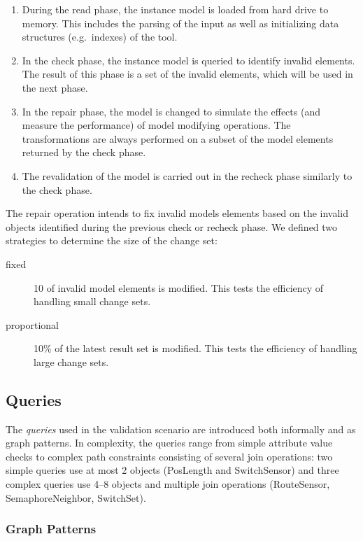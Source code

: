 \documentclass[submission,copyright,creativecommons]{eptcs}
\begin{document}
\begin{enumerate}
	\item During the \textsf{read} phase, the instance model is loaded from hard drive to memory. This includes the parsing of the input as well as initializing data structures (e.g.\ indexes) of the tool.
	\item In the \textsf{check} phase, the instance model is queried to identify invalid elements. The result of this phase is a set of the invalid elements, which will be used in the next phase.
	\item In the \textsf{repair} phase, the model is changed to simulate the effects (and measure the performance) of model modifying operations. The transformations are always performed on a subset of the model elements returned by the \textsf{check} phase. 
	\item The revalidation of the model is carried out in the \textsf{recheck} phase similarly to the \textsf{check} phase.
\end{enumerate}

The repair operation intends to fix invalid models elements based on the invalid objects identified during the previous \textsf{check} or \textsf{recheck} phase. We defined two strategies to determine the size of the change set:

\begin{description}
\item[fixed] 10 of invalid model elements is modified. This tests the efficiency of handling small change sets.
\item[proportional] 10\% of the latest result set is modified. This tests the efficiency of handling large change sets.
\end{description}

\subsection{Queries}
\label{queries}

The \emph{queries} used in the validation scenario are introduced both informally and as graph patterns. In complexity, the queries range from simple attribute value checks to complex path constraints consisting of several join operations: two simple queries use at most 2 objects (\textsf{PosLength} and \textsf{SwitchSensor}) and three complex queries use 4--8 objects and multiple join operations (\textsf{RouteSensor}, \textsf{SemaphoreNeighbor}, \textsf{SwitchSet}). 

\subsubsection{Graph Patterns}
\end{document}
